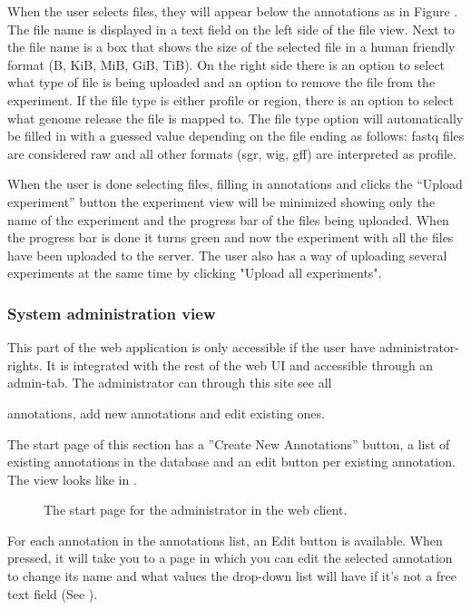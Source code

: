 When the user selects files, they will appear below the annotations as in Figure . The file name is displayed in a text field on the left side of the file view. Next to the file name is a box that shows the size of the selected file in a human friendly format (B, KiB, MiB, GiB, TiB). On the right side there is an option to select what type of file is being uploaded and an option to remove the file from the experiment. If the file type is either profile or region, there is an option to select what genome release the file is mapped to. The file type option will automatically be filled in with a guessed value depending on the file ending as follows: fastq files are considered raw and all other formats (sgr, wig, gff) are interpreted as profile.

When the user is done selecting files, filling in annotations and clicks the “Upload experiment” button the experiment view will be minimized showing only the name of the experiment and the progress bar of the files being uploaded. When the progress bar is done it turns green and now the experiment with all the files have been uploaded to the server. The user also has a way of uploading several experiments at the same time by clicking "Upload all experiments". 

\subsubsection{System administration view}

This part of the web application is only accessible if the user have administrator-rights. It is integrated with the rest of the web UI and accessible through an admin-tab. The administrator can through this site see all 

annotations, add new annotations and edit existing ones.

The start page of this section has a ''Create New Annotations'' button, a list of existing annotations in the database and an edit button per existing annotation. 
The view looks like in . 

\begin{figure}[h]
 \caption{The start page for the administrator in the web client.}
 \label{adm__web_annotationView}
\end{figure}

For each annotation in the annotations list, an Edit button is available. 
When pressed, it will take you to a page in which you can edit the selected annotation to change its name and what values the drop-down list will have if it's not a free text field (See ). 

